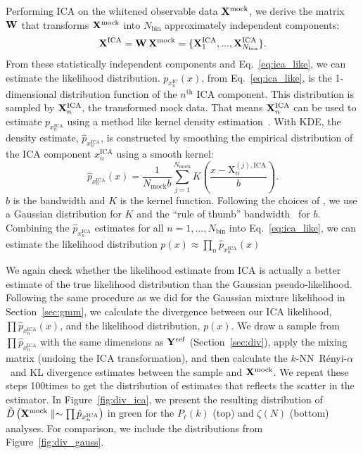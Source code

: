 \documentclass[12pt, letterpaper, preprint]{aastex}
\newcommand{\Nd}{100}
\newcommand{\beq}{\begin{equation}}
\newcommand{\eeq}{\end{equation}}
\newcommand{\Xmock}{{\bf X}^\mathrm{mock}}
\newcommand{\Yref}{{\bf Y}^\mathrm{ref}}
\newcommand{\Ralpha}{R\'enyi-$\alpha$}
\begin{document}
Performing ICA on the whitened observable data $\Xmock$, we derive the 
matrix ${\bf W}$ that transforms $\Xmock$ into $N_\mathrm{bin}$
approximately independent components: 
\beq
{\bf X}^\mathrm{ICA} = {\bf W}\,\Xmock = \{{\bf X}^\mathrm{ICA}_1, ..., {\bf X}^\mathrm{ICA}_{N_\mathrm{bin}}\}.
\eeq
From these statistically independent components and Eq.~\ref{eq:ica_like}, 
we can estimate the likelihood distribution. $p_{x^\mathrm{IC}_n} (x)$, 
from Eq.~\ref{eq:ica_like}, is the 1-dimensional distribution 
function of the $n^\mathrm{th}$ ICA component. This distribution 
is sampled by ${\bf X}^\mathrm{ICA}_n$, the transformed mock data. 
That means ${\bf X}^\mathrm{ICA}_n$ can be used to estimate 
$p_{x^\mathrm{ICA}_n}$ using a method like kernel 
density estimation~\citep[KDE;][]{9780387848587,feigelson2012}. 
With KDE, the density estimate, $\hat{p}_{x^\mathrm{ICA}_n}$, is constructed by 
smoothing the empirical distribution of the ICA component $x^\mathrm{ICA}_n$ 
using a smooth kernel: 
\beq
\hat{p}_{x^\mathrm{ICA}_n}(x) = \frac{1}{N_\mathrm{mock}b} \sum\limits_{j=1}^{N_\mathrm{mock}} K \left( \frac{x - \mathrm{X}^{(j),\mathrm{ICA}}_n}{b} \right). 
\eeq
$b$ is the bandwidth and $K$ is the kernel function. Following the 
choices of \cite{hartlap2009}, we use a Gaussian distribution for $K$ and the 
``rule of thumb'' bandwidth~\cite[also known as Scott's rule;][]{scott1992,davison2008} 
for $b$. Combining the $\hat{p}_{x^\mathrm{ICA}_n}$ estimates for 
all $n = 1, ..., N_\mathrm{bin}$ into Eq.~\ref{eq:ica_like}, we 
can estimate the likelihood distribution $p(x) \approx \prod\limits_n \hat{p}_{x^\mathrm{ICA}_n}(x)$

We again check whether the likelihood estimate from ICA is actually 
a better estimate of the true likelihood distribution than the Gaussian 
pseudo-likelihood. Following the same procedure as we 
did for the Gaussian mixture likelihood in Section~\ref{sec:gmm}, we 
calculate the divergence between our ICA likelihood, $\prod \hat{p}_{x^\mathrm{ICA}_n}(x)$, 
and the likelihood distribution, $p(x)$. We draw a sample from 
$\prod \hat{p}_{x^\mathrm{ICA}_n}$ with the same dimensions as 
$\Yref$ (Section~\ref{sec:div}), apply the mixing matrix 
(undoing the ICA transformation), and then calculate the 
$k$-NN~\Ralpha~and KL divergence estimates between the sample and $\Xmock$. 
We repeat these steps \Nd times to get the distribution of estimates 
that reflects the scatter in the estimator. In Figure~\ref{fig:div_ica}, 
we present the resulting distribution of 
$\hat{D}\left(\Xmock \parallel \sim \prod \hat{p}_{x^\mathrm{ICA}_n} \right)$
in green for the $P_\ell(k)$ (top) and $\zeta(N)$ (bottom) analyses. 
For comparison, we include the distributions from Figure~\ref{fig:div_gauss}. 
\end{document}
